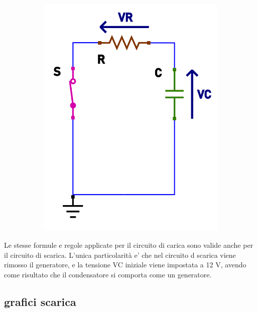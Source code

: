 \documentclass[12pt]{article}
\begin{document}
\begin{figure}[h!]
\begin{subfigure}[b]{0.347\linewidth}
    \includegraphics[width=\linewidth]{data/scarica-tensioni.png}
  \end{subfigure}
\end{figure}

Le stesse formule e regole applicate per il circuito di carica sono valide anche per il circuito di scarica. L'unica particolarità e' che nel circuito d scarica viene rimosso il generatore, e la tensione VC iniziale viene impostata a 12 V, avendo come risultato che il condensatore si comporta come un generatore.

\subsection*{grafici scarica}
\end{document}
